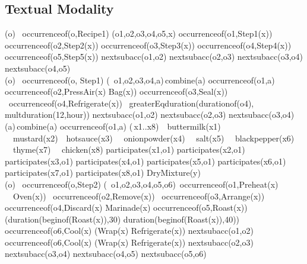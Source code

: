 \subsection{Textual Modality}
\begin{center}

(\forall o) \ occurrence\textunderscore of(o,Recipe1) \supset (\exists o1,o2,o3,o4,o5,x) occurrence\textunderscore of(o1,Step1(x)) \land occurrence\textunderscore of(o2,Step2(x)) \land occurrence\textunderscore of(o3,Step3(x)) \land occurrence\textunderscore of(o4,Step4(x)) \land occurrence\textunderscore of(o5,Step5(x)) \land
next\textunderscore subacc(o1,o2) \land next\textunderscore subacc(o2,o3) \land next\textunderscore subacc(o3,o4) \land next\textunderscore subacc(o4,o5) \\ 

(\forall o) \ occurrence\textunderscore of(o, Step1) \supset (\exists\, o1,o2,o3,o4,a)\,combine(a)\,\land \,occurrence\textunderscore of(o1,a)\\ \land occurrence\textunderscore of(o2,PressAir(x) \land Bag(x)) \land occurrence\textunderscore of(o3,Seal(x)) \\\land \ occurrence\textunderscore of(o4,Refrigerate(x)) \land \ greaterEq\textunderscore duration(duration\textunderscore of(o4),\\ multduration(12,hour)) \land next\textunderscore subacc(o1,o2) \land next\textunderscore subacc(o2,o3) \land next\textunderscore subacc(o3,o4) 
\\

(\forall a)\,combine(a) \land occurrence\textunderscore of(o1,a) \supset (\exists\,x1..x8)\  \ buttermilk(x1) \ \land \  mustard(x2)\ \land \ hotsauce(x3) \   \land \ onionpowder(x4)  \  \land \  salt(x5)  \  \land \  blackpepper(x6)   \ \land \  thyme(x7) \   \land \  chicken(x8) \land participates(x1,o1) \land participates(x2,o1) \land participates(x3,o1) \land participates(x4,o1) \land participates(x5,o1) \land participates(x6,o1) \land participates(x7,o1) \land participates(x8,o1) \land DryMixture(y)\\

(\forall o) \ occurrence\textunderscore of(o,Step2) \supset (\exists\, o1,o2,o3,o4,o5,o6) \land \,occurrence\textunderscore of(o1,Preheat(x) \ \land \ Oven(x)) \land\ occurrence\textunderscore of(o2,Remove(x))  \land\ occurrence\textunderscore of(o3,Arrange(x)) \land occurrence\textunderscore of(o4,Discard(x) \land Marinade(x) \land occurrence\textunderscore of(o5,Roast(x)) \land (duration(beginof(Roast(x)),30) \lor duration(beginof(Roast(x)),40))  \land \\
occurrence\textunderscore of(o6,Cool(x) \lor (Wrap(x) \land Refrigerate(x))
\land next\textunderscore subacc(o1,o2) \land occurrence\textunderscore of(o6,Cool(x) \lor (Wrap(x) \land Refrigerate(x)) \land next\textunderscore subacc(o2,o3) \land next\textunderscore subacc(o3,o4) \land next\textunderscore subacc(o4,o5)
\land next\textunderscore subacc(o5,o6) \\


\end{center}
